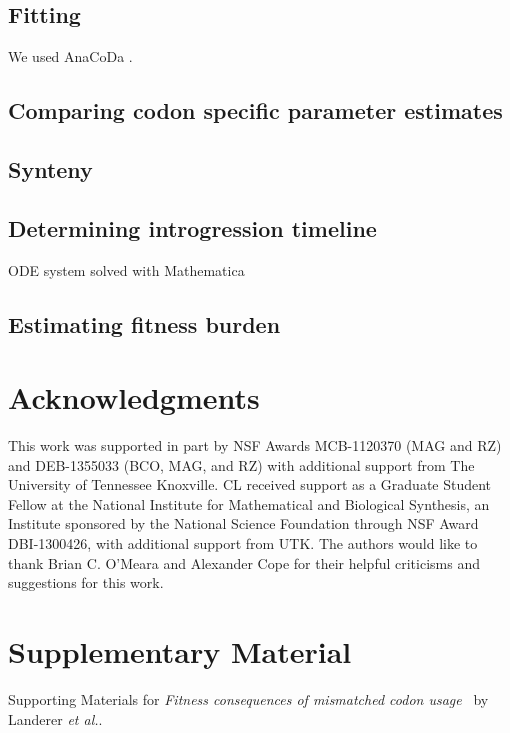 \documentclass[12pt]{article}
\begin{document}
\subsection*{Fitting \ROC}
We used AnaCoDa \citep{landerer2018}.

\subsection*{Comparing codon specific parameter estimates}

\subsection*{Synteny}

\subsection*{Determining introgression timeline}
ODE system solved with Mathematica

\subsection*{Estimating fitness burden}


\section*{Acknowledgments}

This work was supported in part by NSF Awards MCB-1120370 (MAG and RZ) and DEB-1355033 (BCO, MAG, and RZ) with additional support from The University of Tennessee Knoxville. 
CL received support as a Graduate Student Fellow at the National Institute for Mathematical and Biological Synthesis, an Institute sponsored by the National Science Foundation through NSF Award DBI-1300426, with additional support from UTK. 
The authors would like to thank Brian C. O'Meara and Alexander Cope for their helpful criticisms and suggestions for this work.





\clearpage
\section*{Supplementary Material}
\beginsupplement

Supporting Materials for \emph{Fitness consequences of mismatched codon usage} \ by Landerer \emph{et al.}.
\end{document}
